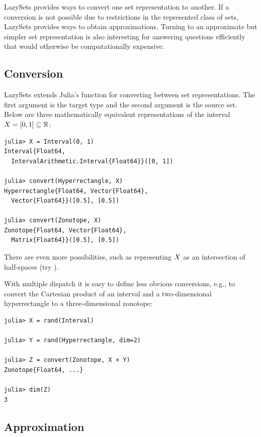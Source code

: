 LazySets provides ways to convert one set representation to another.
If a conversion is not possible due to restrictions in the represented class of sets, LazySets provides ways to obtain approximations.
Turning to an approximate but simpler set representation is also interesting for answering questions efficiently that would otherwise be computationally expensive.


\subsection{Conversion}

LazySets extends Julia's  function for converting between set representations. The first argument is the target type and the second argument is the source set.
%
Below are three mathematically equivalent representations of the interval $X = [0, 1] \subseteq \mathbb{R}$:

\begin{minipage}{\linewidth}
	\begin{lstlisting}
julia> X = Interval(0, 1)
Interval{Float64,
  IntervalArithmetic.Interval{Float64}}([0, 1])

julia> convert(Hyperrectangle, X)
Hyperrectangle{Float64, Vector{Float64},
  Vector{Float64}}([0.5], [0.5])

julia> convert(Zonotope, X)
Zonotope{Float64, Vector{Float64},
  Matrix{Float64}}([0.5], [0.5])
	\end{lstlisting}
\end{minipage}
There are even more possibilities, such as representing $X$ as an intersection of half-spaces (try ).


\smallskip

With multiple dispatch it is easy to define less obvious conversions, e.g., to convert the Cartesian product of an interval and a two-dimensional hyperrectangle to a three-dimensional zonotope:

\begin{minipage}{\linewidth}
	\begin{lstlisting}
julia> X = rand(Interval)

julia> Y = rand(Hyperrectangle, dim=2)

julia> Z = convert(Zonotope, X × Y)
Zonotope{Float64, ...}

julia> dim(Z)
3
\end{lstlisting}
\end{minipage}


\subsection{Approximation}


